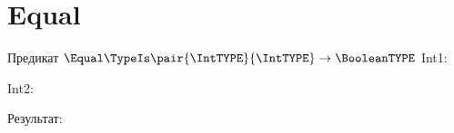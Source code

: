 \section{Equal}
\begin{frame}{Предикат $\Equal\TypeIs\pair{\IntTYPE}{\IntTYPE}\to\BooleanTYPE$}
	Int1:


	Int2:


	Результат:

\end{frame}
